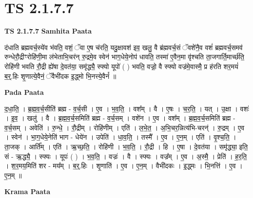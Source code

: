 \documentclass[17pt]{extarticle}
\begin{document}
\section{ TS 2.1.7.7 }

\textbf{TS 2.1.7.7 } \newline
\textbf{Samhita Paata} \newline

द॑धाति ब्रह्मवर्च॒स्ये॑व भ॑वति॒ वशं॒ ॅवा ए॒ष च॑रति॒ यदु॒क्षावश॑ इव॒ खलु॒ वै ब्र॑ह्मवर्च॒सं ॅवशे॑नै॒व वशं॑ ब्रह्मवर्च॒समव॑ रुन्धेरौ॒द्रीꣳरोहि॑णी॒मा ल॑भेताभि॒चर॑न् रु॒द्रमे॒व स्वेन॑ भाग॒धेये॒नोप॑ धावति॒ तस्मा॑ ए॒वैन॒मा वृ॑श्चति ता॒जगार्ति॒मार्च्छ॑ति॒ रोहि॑णी भवति रौ॒द्री ह्ये॑षा दे॒वत॑या॒ समृ॑द्ध्यै॒ स्फ्यो यूपो॑ ( ) भवति॒ वज्रो॒ वै स्फ्यो वज्र॑मे॒वास्मै॒ प्र ह॑रति शर॒मयं॑ ब॒र्॒.हिः शृ॒णात्ये॒वैनं॒ ॅवैभी॑दक इ॒द्ध्मो भि॒नत्त्ये॒वैनं᳚ ॥ \newline

\textbf{Pada Paata} \newline

द॒धा॒ति॒ । ब्र॒ह्म॒व॒र्च॒सीति॑ ब्रह्म - व॒र्च॒सी । ए॒व । भ॒व॒ति॒ । वश᳚म् । वै । ए॒षः । च॒र॒ति॒ । यत् । उ॒क्षा । वशः॑ । इ॒व॒ । खलु॑ । वै । ब्र॒ह्म॒व॒र्च॒समिति॑ ब्रह्म - व॒र्च॒सम् । वशे॑न । ए॒व । वश᳚म् । ब्र॒ह्म॒व॒र्च॒समिति॑ ब्रह्म - व॒र्च॒सम् । अवेति॑ । रु॒न्धे॒ । रौ॒द्रीम् । रोहि॑णीम् । एति॑ । ल॒भे॒त॒ । अ॒भि॒चर॒न्नित्य॑भि-चरन्॑ । रु॒द्रम् । ए॒व । स्वेन॑ । भा॒ग॒धेये॒नेति॑ भाग - धेये॑न । उपेति॑ । धा॒व॒ति॒ । तस्मै᳚ । ए॒व । ए॒न॒म् । एति॑ । वृ॒श्च॒ति॒ । ता॒जक् । आर्ति᳚म् । एति॑ । ऋ॒च्छ॒ति॒ । रोहि॑णी । भ॒व॒ति॒ । रौ॒द्री । हि । ए॒षा । दे॒वत॑या । समृ॑द्ध्या॒ इति॒ सं - ऋ॒द्ध्यै॒ । स्फ्यः । यूपः॑ ( ) । भ॒व॒ति॒ । वज्रः॑ । वै । स्फ्यः । वज्र᳚म् । ए॒व । अ॒स्मै॒ । प्रेति॑ । ह॒र॒ति॒ । श॒र॒मय॒मिति॑ शर - मय᳚म् । ब॒र्॒.हिः । शृ॒णाति॑ । ए॒व । ए॒न॒म् । वैभी॑दकः । इ॒द्ध्मः । भि॒नत्ति॑ । ए॒व । ए॒न॒म् ॥  \newline


\textbf{Krama Paata} \newline
\end{document}
